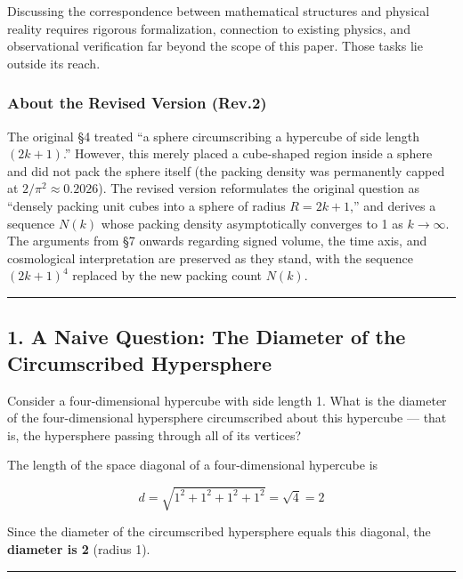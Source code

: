 \documentclass[a4paper,11pt]{article}
\theoremstyle{definition}
\begin{document}
Discussing the correspondence between mathematical structures and
physical reality requires rigorous formalization, connection to existing
physics, and observational verification far beyond the scope of this
paper. Those tasks lie outside its reach.

\subsubsection{About the Revised Version
(Rev.2)}\label{about-the-revised-version-rev.2}

The original §4 treated ``a sphere circumscribing a hypercube of side
length \((2k+1)\).'' However, this merely placed a cube-shaped region
inside a sphere and did not pack the sphere itself (the packing density
was permanently capped at \(2/\pi^2 \approx 0.2026\)). The revised
version reformulates the original question as ``densely packing unit
cubes into a sphere of radius \(R = 2k+1\),'' and derives a sequence
\(N(k)\) whose packing density asymptotically converges to 1 as
\(k \to \infty\). The arguments from §7 onwards regarding signed volume,
the time axis, and cosmological interpretation are preserved as they
stand, with the sequence \((2k+1)^4\) replaced by the new packing count
\(N(k)\).

\begin{center}\rule{0.5\linewidth}{0.5pt}\end{center}

\subsection{1. A Naive Question: The Diameter of the Circumscribed
Hypersphere}\label{a-naive-question-the-diameter-of-the-circumscribed-hypersphere}

Consider a four-dimensional hypercube with side length 1. What is the
diameter of the four-dimensional hypersphere circumscribed about this
hypercube --- that is, the hypersphere passing through all of its
vertices?

The length of the space diagonal of a four-dimensional hypercube is

\[d = \sqrt{1^2 + 1^2 + 1^2 + 1^2} = \sqrt{4} = 2\]

Since the diameter of the circumscribed hypersphere equals this
diagonal, the \textbf{diameter is 2} (radius 1).

\begin{center}\rule{0.5\linewidth}{0.5pt}\end{center}
\end{document}
